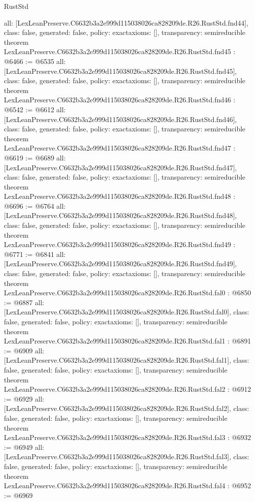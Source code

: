 \begin{lexlean}{RustStd}
\begin{coremodule}
{  all: [LexLeanPreserve.C6632b3a2e999d115038026ca828209de.R26.RustStd.fnd44],
  class: false,
  generated: false,
  policy: exact{axioms: []},
  transparency: semireducible
}
theorem LexLeanPreserve.C6632b3a2e999d115038026ca828209de.R26.RustStd.fnd45 : @6466 := @6535 {
  all: [LexLeanPreserve.C6632b3a2e999d115038026ca828209de.R26.RustStd.fnd45],
  class: false,
  generated: false,
  policy: exact{axioms: []},
  transparency: semireducible
}
theorem LexLeanPreserve.C6632b3a2e999d115038026ca828209de.R26.RustStd.fnd46 : @6542 := @6612 {
  all: [LexLeanPreserve.C6632b3a2e999d115038026ca828209de.R26.RustStd.fnd46],
  class: false,
  generated: false,
  policy: exact{axioms: []},
  transparency: semireducible
}
theorem LexLeanPreserve.C6632b3a2e999d115038026ca828209de.R26.RustStd.fnd47 : @6619 := @6689 {
  all: [LexLeanPreserve.C6632b3a2e999d115038026ca828209de.R26.RustStd.fnd47],
  class: false,
  generated: false,
  policy: exact{axioms: []},
  transparency: semireducible
}
theorem LexLeanPreserve.C6632b3a2e999d115038026ca828209de.R26.RustStd.fnd48 : @6696 := @6764 {
  all: [LexLeanPreserve.C6632b3a2e999d115038026ca828209de.R26.RustStd.fnd48],
  class: false,
  generated: false,
  policy: exact{axioms: []},
  transparency: semireducible
}
theorem LexLeanPreserve.C6632b3a2e999d115038026ca828209de.R26.RustStd.fnd49 : @6771 := @6841 {
  all: [LexLeanPreserve.C6632b3a2e999d115038026ca828209de.R26.RustStd.fnd49],
  class: false,
  generated: false,
  policy: exact{axioms: []},
  transparency: semireducible
}
theorem LexLeanPreserve.C6632b3a2e999d115038026ca828209de.R26.RustStd.fal0 : @6850 := @6887 {
  all: [LexLeanPreserve.C6632b3a2e999d115038026ca828209de.R26.RustStd.fal0],
  class: false,
  generated: false,
  policy: exact{axioms: []},
  transparency: semireducible
}
theorem LexLeanPreserve.C6632b3a2e999d115038026ca828209de.R26.RustStd.fal1 : @6891 := @6909 {
  all: [LexLeanPreserve.C6632b3a2e999d115038026ca828209de.R26.RustStd.fal1],
  class: false,
  generated: false,
  policy: exact{axioms: []},
  transparency: semireducible
}
theorem LexLeanPreserve.C6632b3a2e999d115038026ca828209de.R26.RustStd.fal2 : @6912 := @6929 {
  all: [LexLeanPreserve.C6632b3a2e999d115038026ca828209de.R26.RustStd.fal2],
  class: false,
  generated: false,
  policy: exact{axioms: []},
  transparency: semireducible
}
theorem LexLeanPreserve.C6632b3a2e999d115038026ca828209de.R26.RustStd.fal3 : @6932 := @6949 {
  all: [LexLeanPreserve.C6632b3a2e999d115038026ca828209de.R26.RustStd.fal3],
  class: false,
  generated: false,
  policy: exact{axioms: []},
  transparency: semireducible
}
theorem LexLeanPreserve.C6632b3a2e999d115038026ca828209de.R26.RustStd.fal4 : @6952 := @6969 {
}
\end{coremodule}
\end{lexlean}

